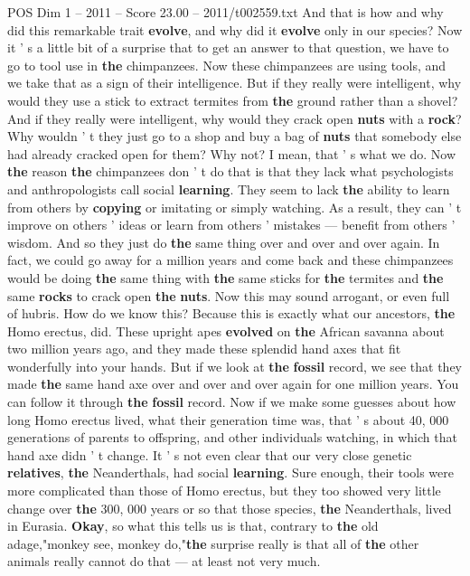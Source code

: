 \begin{textsample}{POS Dim 1 – 2011 – Score 23.00 – 2011/t002559.txt}
And that is how and why did this remarkable trait \textbf{evolve}, and why did it \textbf{evolve} only in our species?
Now it ' s a little bit of a surprise that to get an answer to that question, we have to go to tool use in \textbf{the} chimpanzees.
Now these chimpanzees are using tools, and we take that as a sign of their intelligence.
But if they really were intelligent, why would they use a stick to extract termites from \textbf{the} ground rather than a shovel?
And if they really were intelligent, why would they crack open \textbf{nuts} with a \textbf{rock}?
Why wouldn ' t they just go to a shop and buy a bag of \textbf{nuts} that somebody else had already cracked open for them?
Why not?
I mean, that ' s what we do.
Now \textbf{the} reason \textbf{the} chimpanzees don ' t do that is that they lack what psychologists and anthropologists call social \textbf{learning}.
They seem to lack \textbf{the} ability to learn from others by \textbf{copying} or imitating or simply watching.
As a result, they can ' t improve on others ' ideas or learn from others ' mistakes — benefit from others ' wisdom.
And so they just do \textbf{the} same thing over and over and over again.
In fact, we could go away for a million years and come back and these chimpanzees would be doing \textbf{the} same thing with \textbf{the} same sticks for \textbf{the} termites and \textbf{the} same \textbf{rocks} to crack open \textbf{the} \textbf{nuts}.
Now this may sound arrogant, or even full of hubris.
How do we know this?
Because this is exactly what our ancestors, \textbf{the} Homo erectus, did.
These upright apes \textbf{evolved} on \textbf{the} African savanna about two million years ago, and they made these splendid hand axes that fit wonderfully into your hands.
But if we look at \textbf{the} \textbf{fossil} record, we see that they made \textbf{the} same hand axe over and over and over again for one million years.
You can follow it through \textbf{the} \textbf{fossil} record.
Now if we make some guesses about how long Homo erectus lived, what their generation time was, that ' s about 40, 000 generations of parents to offspring, and other individuals watching, in which that hand axe didn ' t change.
It ' s not even clear that our very close genetic \textbf{relatives}, \textbf{the} Neanderthals, had social \textbf{learning}.
Sure enough, their tools were more complicated than those of Homo erectus, but they too showed very little change over \textbf{the} 300, 000 years or so that those species, \textbf{the} Neanderthals, lived in Eurasia. \textbf{Okay}, so what this tells us is that, contrary to \textbf{the} old adage,"monkey see, monkey do,"\textbf{the} surprise really is that all of \textbf{the} other animals really cannot do that — at least not very much.

\end{textsample}
